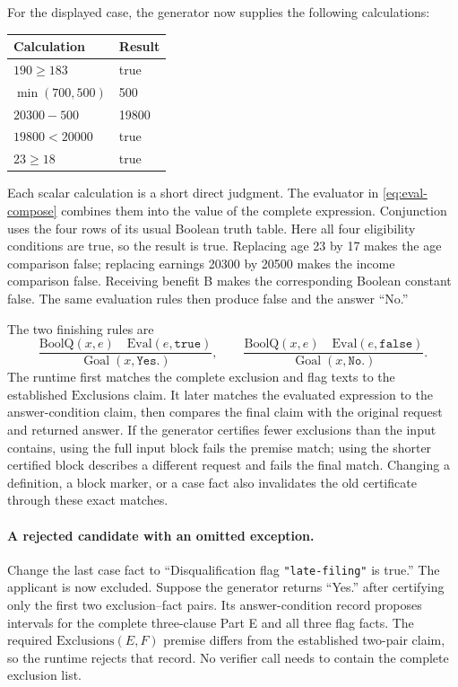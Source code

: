 \documentclass[11pt,twoside]{article}
\theoremstyle{definition}
\newcommand{\Goal}{\operatorname{Goal}}
\begin{document}
For the displayed case, the generator now supplies the following calculations:
\begin{center}
\begin{tabular}{ll}
\toprule
Calculation & Result\\
\midrule
$190\ge183$ & true\\
$\min(700,500)$ & 500\\
$20300-500$ & 19800\\
$19800<20000$ & true\\
$23\ge18$ & true\\
\bottomrule
\end{tabular}
\end{center}
Each scalar calculation is a short direct judgment. The evaluator in
\cref{eq:eval-compose} combines them into the value of the complete
expression. Conjunction uses the four rows of its usual Boolean truth table.
Here all four eligibility conditions are true, so the result is true.
Replacing age 23 by 17 makes the age comparison false; replacing earnings
20300 by 20500 makes the income comparison false. Receiving benefit B
makes the corresponding Boolean constant false. The same evaluation rules
then produce false and the answer ``No.''

The two finishing rules are
\begin{equation}
 \frac{\mathrm{BoolQ}(x,e)\quad \mathrm{Eval}(e,\texttt{true})}
 {\Goal(x,\texttt{Yes.})},\qquad
 \frac{\mathrm{BoolQ}(x,e)\quad \mathrm{Eval}(e,\texttt{false})}
 {\Goal(x,\texttt{No.})}.
\end{equation}
The runtime first matches the complete exclusion and flag texts to the
established $\mathrm{Exclusions}$ claim. It later matches the evaluated
expression to the answer-condition claim, then
compares the final claim with the original request and returned answer.
If the generator certifies fewer exclusions than the input contains,
using the full input block fails the premise match; using the shorter
certified block describes a different request and fails the final match.
Changing a definition, a block marker, or a case fact also invalidates the
old certificate through these exact matches.

\paragraph{A rejected candidate with an omitted exception.}
Change the last case fact to ``Disqualification flag \texttt{"late-filing"}
is true.'' The applicant is now excluded. Suppose the generator returns
``Yes.'' after certifying only the first two exclusion--fact pairs. Its
answer-condition record proposes intervals for the complete three-clause
Part E and all three flag facts. The required
$\mathrm{Exclusions}(E,F)$ premise differs from the established two-pair
claim, so the runtime rejects that record. No verifier call needs to
contain the complete exclusion list.
\end{document}
